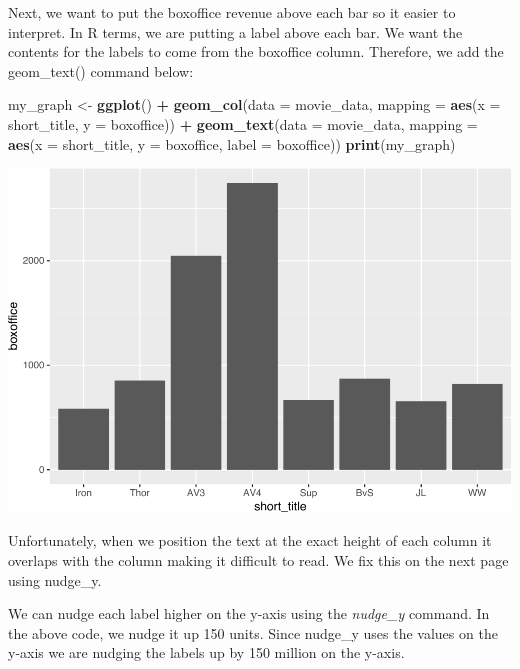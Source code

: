 \documentclass[
]{krantz}
\makeatletter
\newenvironment{Shaded}{\begin{snugshade}}{\end{snugshade}}
\newcommand{\DataTypeTok}[1]{\textcolor[rgb]{0.27,0.27,0.27}{#1}}
\newcommand{\KeywordTok}[1]{\textcolor[rgb]{0.27,0.27,0.27}{\textbf{#1}}}
\newcommand{\NormalTok}[1]{#1}
\newcommand{\OperatorTok}[1]{\textcolor[rgb]{0.43,0.43,0.43}{\textbf{#1}}}
\newcommand{\StringTok}[1]{\textcolor[rgb]{0.5,0.5,0.5}{#1}}
\newenvironment{kframe}{%
\medskip{}
\setlength{\fboxsep}{.8em}
 \def\at@end@of@kframe{}%
 \ifinner\ifhmode%
  \def\at@end@of@kframe{\end{minipage}}%
  \begin{minipage}{\columnwidth}%
 \fi\fi%
 \def\FrameCommand##1{\hskip\@totalleftmargin \hskip-\fboxsep
 \colorbox{shadecolor}{##1}\hskip-\fboxsep
     \hskip-\linewidth \hskip-\@totalleftmargin \hskip\columnwidth}%
 \MakeFramed {\advance\hsize-\width
   \@totalleftmargin\z@ \linewidth\hsize
   \@setminipage}}%
 {\par\unskip\endMakeFramed%
 \at@end@of@kframe}
\renewenvironment{Shaded}{\begin{kframe}}{\end{kframe}}
\makeatother
\begin{document}
Next, we want to put the boxoffice revenue above each bar so it easier to interpret. In R terms, we are putting a label above each bar. We want the contents for the labels to come from the boxoffice column. Therefore, we add the geom\_text() command below:

\begin{Shaded}
\begin{Highlighting}[]
\NormalTok{my_graph <-}\StringTok{ }\KeywordTok{ggplot}\NormalTok{() }\OperatorTok{+}
\StringTok{  }\KeywordTok{geom_col}\NormalTok{(}\DataTypeTok{data =}\NormalTok{ movie_data,}
           \DataTypeTok{mapping =} \KeywordTok{aes}\NormalTok{(}\DataTypeTok{x =}\NormalTok{ short_title, }
                         \DataTypeTok{y =}\NormalTok{ boxoffice)) }\OperatorTok{+}
\StringTok{  }\KeywordTok{geom_text}\NormalTok{(}\DataTypeTok{data =}\NormalTok{ movie_data, }
           \DataTypeTok{mapping =} \KeywordTok{aes}\NormalTok{(}\DataTypeTok{x =}\NormalTok{ short_title, }
                         \DataTypeTok{y =}\NormalTok{ boxoffice, }
                         \DataTypeTok{label =}\NormalTok{ boxoffice))}
\KeywordTok{print}\NormalTok{(my_graph)}
\end{Highlighting}
\end{Shaded}

\includegraphics[width=0.65\linewidth]{bookdown_files/figure-latex/unnamed-chunk-109-1}

Unfortunately, when we position the text at the exact height of each column it overlaps with the column making it difficult to read. We fix this on the next page using nudge\_y.

We can nudge each label higher on the y-axis using the \emph{nudge\_y} command. In the above code, we nudge it up 150 units. Since nudge\_y uses the values on the y-axis we are nudging the labels up by 150 million on the y-axis.
\end{document}
